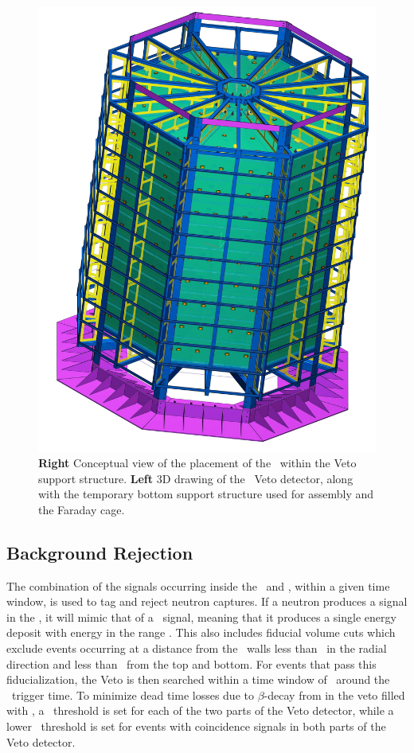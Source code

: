 \begin{figure}[!t]
\includegraphics[height=0.4\textheight]{./Figures/Veto-Faraday_new.jpg}
\caption[3D drawings of the \DSks\ Veto detector.]{{\bf Right} Conceptual view of the placement of the \TPC\ within the Veto support structure. {\bf Left} 3D drawing of the \DSks\ Veto detector, along with the temporary bottom support structure used for assembly and the Faraday cage.}
\label{fig:VetoAssembly}
\end{figure}

\subsection{Background Rejection}

The combination of the signals occurring inside the \IAB\ and \OAB, within a given time window, is used to tag and reject neutron captures.  If a neutron produces a signal in the \TPC, it will mimic that of a \WIMP\ signal, meaning that it produces a single energy deposit with energy in the range \DSkROIEnergyRange.  This also includes fiducial volume cuts which exclude events occurring at a distance from the \TPC\ walls less than \DSkVetoFVTPCcut\ in the radial direction and less than \DSkVetoFVTPCcutz\ from the top and bottom.  For events that pass this fiducialization, the Veto is then searched within a time window of  \DSkVetoTimeCut\ around the \TPC\ trigger time. To minimize dead time losses due to $\beta$-decay from  in the veto filled with \AAr,  a \ABSingleThreshold\ threshold is set for each of the two parts of the Veto detector, while a lower \ABCoincidenceThreshold\ threshold is set for events with coincidence signals in both parts of the Veto detector.

